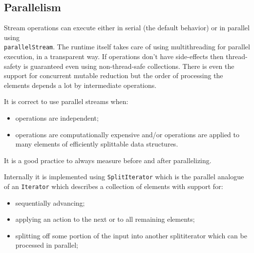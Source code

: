 \subsection{Parallelism}
Stream operations can execute either in serial (the default behavior) or in parallel using \\
\verb|parallelStream|.
The runtime itself takes care of using multithreading for parallel execution, in a transparent way.
If operations don't have side-effects then thread-safety is guaranteed even using non-thread-safe collections.
There is even the support for concurrent mutable reduction but the order of processing the elements depends a lot by intermediate operations.

It is correct to use parallel streams when:
\begin{itemize}
    \item operations are independent;
    \item operations are computationally expensive and/or operations are applied to many elements of efficiently splittable data structures.
\end{itemize}
It is a good practice to always measure before and after parallelizing.

Internally it is implemented using \verb|SplitIterator| which is the parallel analogue of an \verb|Iterator| which describes a collection of elements with support for:
\begin{itemize}
    \item sequentially advancing;
    \item applying an action to the next or to all remaining elements;
    \item splitting off some portion of the input into another splititerator which can be processed in parallel;
\end{itemize}

